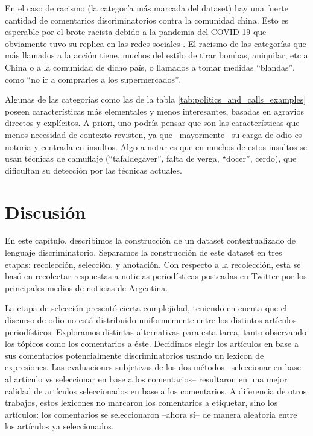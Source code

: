 En el caso de racismo (la categoría más marcada del dataset) hay una fuerte cantidad de comentarios discriminatorios contra la comunidad china. Esto es esperable por el brote racista debido a la pandemia del COVID-19 que obviamente tuvo su replica en las redes sociales \cite{he2021racism}. El racismo de las categorías que más llamados a la acción tiene, muchos del estilo de tirar bombas, aniquilar, etc a China o a la comunidad de dicho país, o llamados a tomar medidas ``blandas'', como ``no ir a comprarles a los supermercados''.

Algunas de las categorías como las de la tabla \ref{tab:politics_and_calls_examples} poseen características más elementales y menos interesantes, basadas en agravios directos y explícitos. A priori, uno podría pensar que son las características que menos necesidad de contexto revisten, ya que --mayormente-- su carga de odio es notoria y centrada en insultos. Algo a notar es que en muchos de estos insultos se usan técnicas de camuflaje (``tafaldegaver'', falta de verga, ``docer'', cerdo), que dificultan su detección por las técnicas actuales.




\section{Discusión}

En este capítulo, describimos la construcción de un dataset contextualizado de lenguaje discriminatorio. Separamos la construcción de este dataset en tres etapas: recolección, selección, y anotación. Con respecto a la recolección, esta se basó en recolectar respuestas a noticias periodísticas posteadas en Twitter por los principales medios de noticias de Argentina.

La etapa de selección presentó cierta complejidad, teniendo en cuenta que el discurso de odio no está distribuido uniformemente entre los distintos artículos periodísticos. Exploramos distintas alternativas para esta tarea, tanto observando los tópicos como los comentarios a éste. Decidimos elegir los artículos en base a sus comentarios potencialmente discriminatorios usando un lexicon de expresiones. Las evaluaciones subjetivas de los dos métodos --seleccionar en base al artículo vs seleccionar en base a los comentarios-- resultaron en una mejor calidad de artículos seleccionados en base a los comentarios. A diferencia de otros trabajos, estos lexicones no marcaron los comentarios a etiquetar, sino los artículos: los comentarios se seleccionaron --ahora sí-- de manera aleatoria entre los artículos ya seleccionados.


